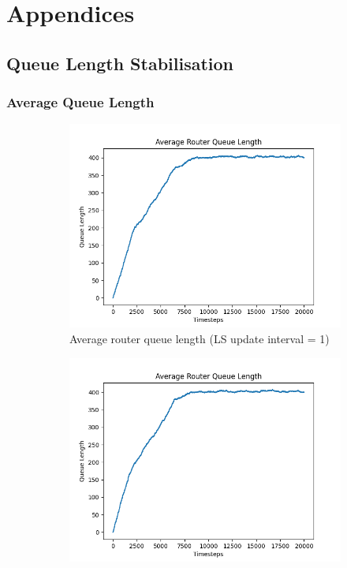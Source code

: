 \appendixpage
\appendix
\chapter*{Appendices}
\renewcommand{\thesection}{\Alph{section})}
\renewcommand{\thesubsection}{\Alph{section}.\arabic{subsection}}

\section{Queue Length Stabilisation}
\label{sec:Aqueuestabilization}
\subsection{Average Queue Length}
    \begin{figure}[h]
        \centering
        \begin{subfigure}[b]{0.475\textwidth}
            \centering
            \includegraphics[width=\textwidth]{figs/appendix/average_ls=1.png}
            \caption[]{Average router queue length (LS update interval = 1)}
        \end{subfigure}
        \hfill
        \begin{subfigure}[b]{0.475\textwidth}
            \centering
            \includegraphics[width=\textwidth]{figs/appendix/average_ls=10.png}

\end{subfigure}
\end{figure}
